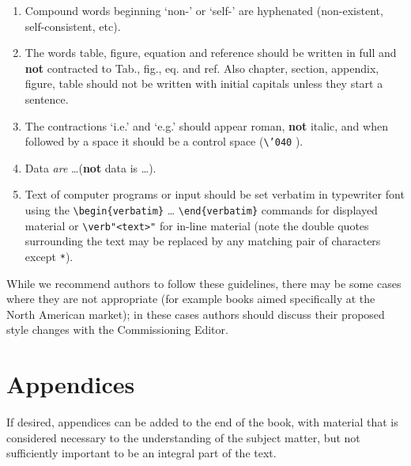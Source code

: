 \begin{enumerate}
\item Compound words 
beginning `non-' or `self-' are hyphenated 
(non-existent, self-consistent, etc).

\item The words table, figure, equation and reference should be written 
in full and {\bf not} contracted to Tab., fig., eq. and ref.
Also chapter, section, appendix, figure, table 
should not be written with initial
capitals unless they start a sentence.
  
\item The contractions 
`i.e.' and `e.g.' should appear roman, {\bf not} 
italic, and when followed by a space it should be a control space 
(\verb"\"{\tt\char'040} ).

\item Data {\it are} \dots ({\bf not} data is \dots).

\item Text of computer programs or input should be set verbatim in
typewriter font using the \verb"\begin{verbatim}" \dots
\verb"\end{verbatim}" commands for displayed material or
\verb+\verb"<text>"+ for in-line material (note the double quotes
surrounding the text may be
replaced by any matching pair of characters except \verb"*"). 
\end{enumerate}

While we recommend authors to follow these guidelines, there may be some
cases where they are not appropriate (for example books aimed
specifically at the North American market); in these cases authors
should discuss their proposed style changes with the Commissioning Editor. 

\section{Appendices} 
If desired, appendices can be added
to the end of the book, with material that is considered necessary to the
understanding of the subject matter, but not sufficiently important to be
an integral part of the text. 



